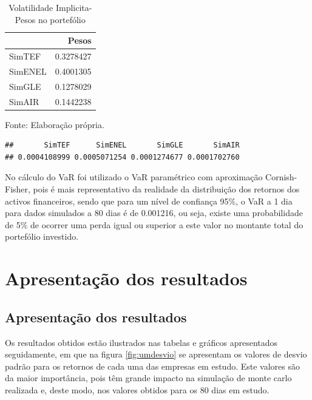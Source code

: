 \documentclass[
  12pt,
  a4paper,
  openany]{book}
\theoremstyle{definition}
\theoremstyle{definition}
\theoremstyle{definition}
\theoremstyle{remark}
\begin{document}
\begin{table}[!h]

\caption{\label{tab:minVIk}Volatilidade Implicita- Pesos no portefólio}
\centering
\begin{tabular}[t]{lr}
\toprule
  & Pesos\\
\midrule
SimTEF & 0.3278427\\
SimENEL & 0.4001305\\
SimGLE & 0.1278029\\
SimAIR & 0.1442238\\
\bottomrule
\end{tabular}
\end{table}
\FloatBarrier
\centering

Fonte: Elaboração própria.

\justifying
\bigskip

\begin{verbatim}
##       SimTEF      SimENEL       SimGLE       SimAIR 
## 0.0004108999 0.0005071254 0.0001274677 0.0001702760
\end{verbatim}

No cálculo do VaR foi utilizado o VaR paramétrico com aproximação Cornish-Fisher, pois é mais representativo da realidade da distribuição dos retornos dos activos financeiros, sendo que para um nível de confiança 95\%, o VaR a 1 dia para dados simulados a 80 dias é de 0.001216, ou seja, existe uma probabilidade de 5\% de ocorrer uma perda igual ou superior a este valor no montante total do portefólio investido.

\hypertarget{apresentauxe7uxe3o-dos-resultados}{%
\chapter{Apresentação dos resultados}\label{apresentauxe7uxe3o-dos-resultados}}

\endgroup
\newpage

\hypertarget{apresentauxe7uxe3o-dos-resultados-1}{%
\section{Apresentação dos resultados}\label{apresentauxe7uxe3o-dos-resultados-1}}

Os resultados obtidos estão ilustrados nas tabelas e gráficos apresentados seguidamente, em que na figura \ref{fig:umdesvio} se apresentam os valores de desvio padrão para os retornos de cada uma das empresas em estudo. Este valores são da maior importância, pois têm grande impacto na simulação de monte carlo realizada e, deste modo, nos valores obtidos para os 80 dias em estudo.
\end{document}
